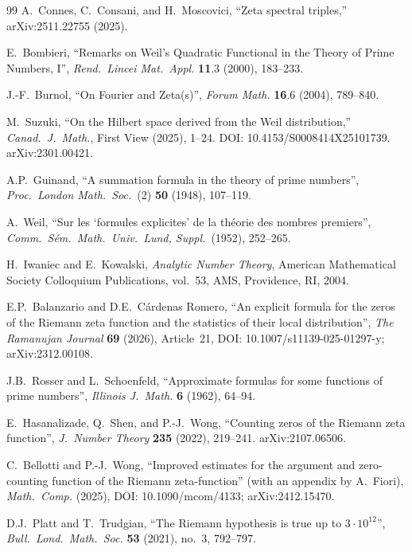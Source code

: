 \documentclass[11pt]{article}
\begin{document}
\begin{thebibliography}{99}
A.~Connes, C.~Consani, and H.~Moscovici,
``Zeta spectral triples,''
arXiv:2511.22755 (2025).

E.~Bombieri,
``Remarks on Weil's Quadratic Functional in the Theory of Prime
Numbers, I'',
\emph{Rend.\ Lincei Mat.\ Appl.} \textbf{11}.3 (2000), 183--233.

J.-F.~Burnol,
``On Fourier and Zeta(s)'',
\emph{Forum Math.} \textbf{16}.6 (2004), 789--840.

M.~Suzuki,
``On the Hilbert space derived from the Weil distribution,''
\textit{Canad.\ J.\ Math.}, First View (2025), 1--24.
DOI: 10.4153/S0008414X25101739.
arXiv:2301.00421.

A.P.~Guinand,
``A summation formula in the theory of prime numbers'',
\emph{Proc.\ London Math.\ Soc.}\ (2) \textbf{50} (1948), 107--119.

A.~Weil,
``Sur les `formules explicites' de la th\'{e}orie des nombres premiers'',
\emph{Comm.\ S\'{e}m.\ Math.\ Univ.\ Lund, Suppl.}\ (1952), 252--265.

H.~Iwaniec and E.~Kowalski,
\emph{Analytic Number Theory},
American Mathematical Society Colloquium Publications,
vol.~53, AMS, Providence, RI, 2004.

E.P.~Balanzario and D.E.~C\'{a}rdenas Romero,
``An explicit formula for the zeros of the Riemann zeta function
and the statistics of their local distribution'',
\emph{The Ramanujan Journal} \textbf{69} (2026), Article~21,
DOI: 10.1007/s11139-025-01297-y; arXiv:2312.00108.

J.B.~Rosser and L.~Schoenfeld,
``Approximate formulas for some functions of prime numbers'',
\emph{Illinois J.\ Math.} \textbf{6} (1962), 64--94.

E.~Hasanalizade, Q.~Shen, and P.-J.~Wong,
``Counting zeros of the Riemann zeta function'',
\emph{J.\ Number Theory} \textbf{235} (2022), 219--241.
arXiv:2107.06506.

C.~Bellotti and P.-J.~Wong,
``Improved estimates for the argument and zero-counting function of the
Riemann zeta-function'' (with an appendix by A.~Fiori),
\emph{Math.\ Comp.} (2025), DOI: 10.1090/mcom/4133; arXiv:2412.15470.

D.J.~Platt and T.~Trudgian,
``The Riemann hypothesis is true up to $3\cdot10^{12}$'',
\emph{Bull.\ Lond.\ Math.\ Soc.} \textbf{53} (2021), no.~3, 792--797.


\end{thebibliography}
\end{document}
